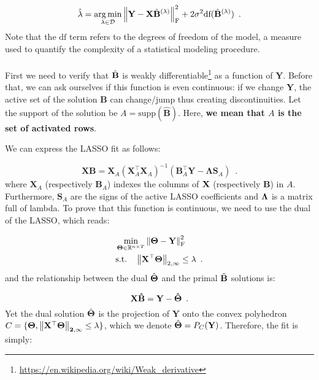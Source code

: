 \documentclass[a4paper,10pt]{article}
\theoremstyle{definition}
\begin{document}
\begin{equation*}
    \hat{\lambda} = \operatorname*{arg\,min}_{\lambda \in \mathcal{D}} \left \lVert  \mathbf{Y} - \mathbf{X}\hat{\mathbf{B}}^{(\lambda)}  \right \rVert_{\text{F}}^2
    + 2 \sigma^2 \text{df}(\hat{\bf{B}}^{(\lambda)})
    \enspace .
\end{equation*}
%
Note that the $\text{df}$ term refers to the degrees of freedom of the model, a measure used to quantify the complexity of a statistical modeling procedure.
\\
\\
First we need to verify that $\hat{\bf{B}}$ is weakly differentiable\footnote{\url{https://en.wikipedia.org/wiki/Weak_derivative}} as a function of $\mathbf{Y}$.
Before that, we can ask ourselves if this function is even continuous: if
we change $\mathbf{Y}$, the active set of the solution $\mathbf{B}$ can change/jump thus creating discontinuities.
Let the support of the solution be $A = \text{supp}(\hat{\mathbf{B}})$. Here, \textbf{we mean that $A$ is the set of activated rows}.

\newpage

We can express the LASSO fit as follows:

\begin{equation*}
    \mathbf{XB} = \mathbf{X}_A
    (\mathbf{X}_A^{\top}\mathbf{X}_A)^{-1}
    (\mathbf{B}^{\top}_A\mathbf{Y} - \mathbf{\Lambda}\mathbf{S}_A)
    \enspace .
\end{equation*}
%
where $\mathbf{X}_A$ (respectively $\mathbf{B}_A$) indexes the columns of $\bf X$ (respectively $\mathbf{B}$) in $A$. Furthermore, $\mathbf{S}_A$ are the signs of the active
LASSO coefficients and $\bf\Lambda$ is a matrix full of lambda. To prove that this function is continuous, we need to use the dual of the LASSO, which reads:

\begin{align*}
    &\min_{\mathbf{\Theta} \in \mathbb{R}^{n \times T}} \left \lVert  \mathbf{\Theta} - \mathbf{Y}  \right \rVert_{\text{F}}^2 \\
    &\text{s.t.} \quad \left \lVert \mathbf{X^{\top}\Theta} \right \rVert_{2, \infty} \leq \lambda
    \enspace .
\end{align*}
%
and the relationship between the dual $\hat{\bf{\Theta}}$ and the primal $\hat{\bf{B}}$ solutions is:

\begin{equation*}
    \bf{X} \hat{\bf{B}} = \mathbf{Y - \hat{\Theta}}
    \enspace .
\end{equation*}
%
Yet the dual solution $\hat{\bf{\Theta}}$ is the projection of $\mathbf{Y}$ onto the convex polyhedron $C = \{\bf{\Theta}, \left \lVert \mathbf{X^{\top}\Theta} \right \rVert_{2, \infty} \leq \lambda\}$,
which we denote $\hat{\bf{\Theta}} = P_C(\bf{Y})$. Therefore, the  fit is simply:
\end{document}

